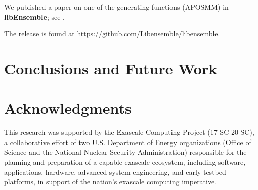 \documentclass{ecpreport}
\begin{document}

We published a paper on one of the generating functions (APOSMM) in {\bf 
libEnsemble}; see \cite{LW17}.

The release is found at 
\url{https://github.com/Libensemble/libensemble}.

\section{Conclusions and Future Work}


\section*{Acknowledgments}

This research was supported by the Exascale Computing Project (17-SC-20-SC), a collaborative 
effort of two U.S. Department of Energy organizations (Office of Science and the National 
Nuclear Security Administration) responsible for the planning and preparation of a 
capable exascale ecosystem, including software, applications, hardware, advanced 
system engineering, and early testbed platforms, in support of the nation’s 
exascale computing imperative.





% 
\end{document}

